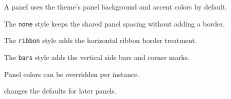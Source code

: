 \documentclass{book}
\begin{document}
\begin{RPGPanel}[title={Default Panel}]
    A panel uses the theme's panel background and accent colors by default.
\end{RPGPanel}

\begin{RPGPanel}[style=none, title={No Border}]
    The \texttt{none} style keeps the shared panel spacing without adding a border.
\end{RPGPanel}

\begin{RPGPanel}[style=ribbon, title={Ribbon Style}]
    The \texttt{ribbon} style adds the horizontal ribbon border treatment.
\end{RPGPanel}

\begin{RPGPanel}[style=bars, title={Bars Style}]
    The \texttt{bars} style adds the vertical side bars and corner marks.
\end{RPGPanel}

\begin{RPGPanel}[
    style=ribbon,
    accent=RPGColorForest,
    background=RPGColorOlive,
    title={Local Colors}
]
    Panel colors can be overridden per instance.
\end{RPGPanel}


\begin{RPGPanel}[title={Configured Defaults}]
    \texttt{\string\RPGColorSet} changes the defaults for later panels.
\end{RPGPanel}
\end{document}
